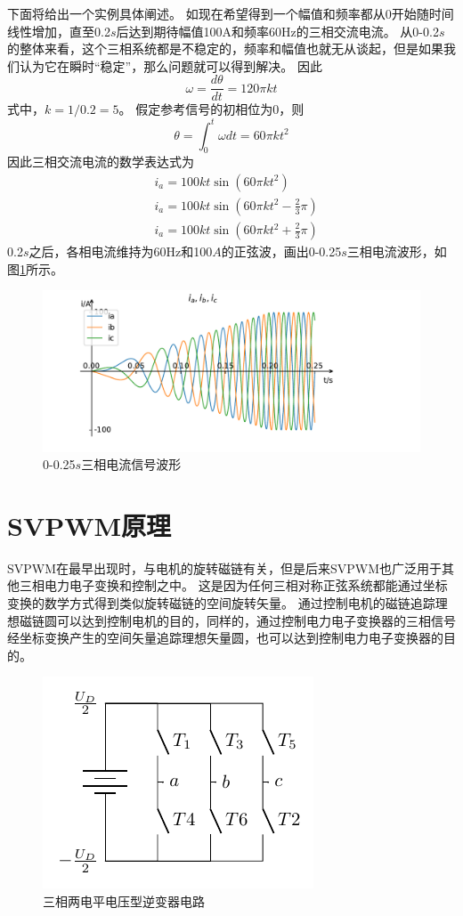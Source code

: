 \documentclass{ctexart}
\numberwithin{equation}{section}
\begin{document}
下面将给出一个实例具体阐述。
如现在希望得到一个幅值和频率都从0开始随时间线性增加，直至0.2$s$后达到期待幅值100A和频率60Hz的三相交流电流。
从0-0.2$s$的整体来看，这个三相系统都是不稳定的，频率和幅值也就无从谈起，但是如果我们认为它在瞬时“稳定”，那么问题就可以得到解决。
因此
\begin{equation}
  \omega = \frac{d\theta}{dt} = 120\pi kt
\end{equation}
式中，$ k = 1/0.2 = 5 $。
假定参考信号的初相位为0，则
\begin{equation}
  \theta = \int_0^{t} \omega dt = 60\pi kt^2
\end{equation}
因此三相交流电流的数学表达式为
\begin{equation}
  \begin{aligned}
  	&i_a = 100kt\sin (60\pi kt^2 )\\
  	&i_a = 100kt\sin (60\pi kt^2 -\frac{2}{3}\pi )\\
  	&i_a = 100kt\sin (60\pi kt^2 + \frac{2}{3}\pi )
  \end{aligned}
\end{equation}
0.2$ s $之后，各相电流维持为60Hz和100$ A $的正弦波，画出0-0.25$ s $三相电流波形，如图\ref{kw-kA-sine-wave}所示。

\begin{figure}[htb]
  \centering
  \includegraphics[width = .8\linewidth ]{sin_wave_kA_kw}
  \caption{0-0.25$ s $三相电流信号波形}
  \label{kw-kA-sine-wave}
\end{figure}

\section{SVPWM原理}
SVPWM在最早出现时，与电机的旋转磁链有关，但是后来SVPWM也广泛用于其他三相电力电子变换和控制之中。
这是因为任何三相对称正弦系统都能通过坐标变换的数学方式得到类似旋转磁链的空间旋转矢量。
通过控制电机的磁链追踪理想磁链圆可以达到控制电机的目的，同样的，通过控制电力电子变换器的三相信号经坐标变换产生的空间矢量追踪理想矢量圆，也可以达到控制电力电子变换器的目的。
\begin{figure}[htb]
  \centering
  \includegraphics[width = .5\linewidth ]{three-phase-converter.pdf}
  \caption{三相两电平电压型逆变器电路}
  \label{three-phase-converter}
\end{figure}  
\end{document}

